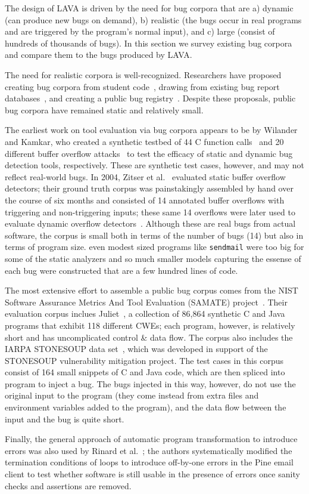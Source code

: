 The design of LAVA is driven by the need for bug corpora that are a)
dynamic (can produce new bugs on demand), b) realistic (the bugs occur
in real programs and are triggered by the program's normal input), and
c) large (consist of hundreds of thousands of bugs). In this section we
survey existing bug corpora and compare them to the bugs produced by
LAVA.

The need for realistic corpora is well-recognized. Researchers have
proposed creating bug corpora from student code~\cite{Spacco:2005},
drawing from existing bug report databases~\cite{Lu:2005,Meftah:2005},
and creating a public bug registry~\cite{Foster:2005}. Despite these
proposals, public bug corpora have remained static and relatively small.

The earliest work on tool evaluation via bug corpora appears to be by
Wilander and Kamkar, who created a synthetic testbed of 44 C function
calls~\cite{Wilander:2002} and 20 different buffer overflow
attacks~\cite{Wilander:2003} to test the efficacy of static and dynamic
bug detection tools, respectively. These are synthetic test cases,
however, and may not reflect real-world bugs. In 2004, Zitser et
al.~\cite{Zitser:2004} evaluated static buffer overflow detectors; their
ground truth corpus was painstakingly assembled by hand over the course
of six months and consisted of 14 annotated buffer overflows with
triggering and non-triggering inputs; these same 14 overflows were later
used to evaluate dynamic overflow detectors~\cite{Zhivich:2005}.
Although these are real bugs from actual software, the corpus is small
both in terms of the number of bugs (14) but also in terms of program size.
even modest sized programs like \verb+sendmail+ were too big for some of
the static analyzers and so much smaller models capturing the essense of 
each bug were constructed that are a few hundred lines of code.  

The most extensive effort to assemble a public bug corpus comes from the
NIST Software Assurance Metrics And Tool Evaluation (SAMATE)
project~\cite{Kass:2005}. Their evaluation corpus inclues
Juliet~\cite{Juliet:2012}, a collection of 86,864 synthetic C and Java
programs that exhibit 118 different CWEs; each program, however, is
relatively short and has uncomplicated control \& data flow. The corpus
also includes the IARPA STONESOUP data set~\cite{SAMATE:2014}, which was
developed in support of the STONESOUP vulnerability mitigation project.
The test cases in this corpus consist of 164 small snippets of C and
Java code, which are then spliced into program to inject a bug. The bugs
injected in this way, however, do not use the original input to the
program (they come instead from extra files and environment variables
added to the program), and the data flow between the input and the bug
is quite short.

Finally, the general approach of automatic program transformation to
introduce errors was also used by Rinard et al.~\cite{Rinard:2005}; the
authors systematically modified the termination conditions of loops to
introduce off-by-one errors in the Pine email client to test whether
software is still usable in the presence of errors once sanity checks
and assertions are removed.

